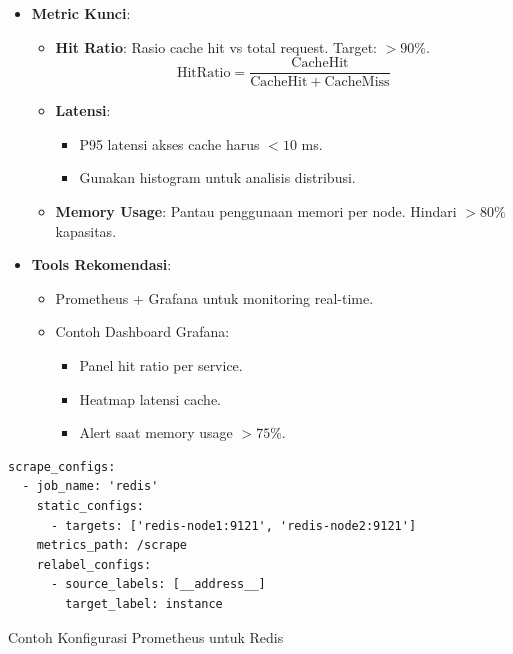 \documentclass[11pt, a4paper]{book}
\begin{document}
	\begin{itemize}
		\item \textbf{Metric Kunci}:  
		\begin{itemize}
			\item \textbf{Hit Ratio}:  
			Rasio cache hit vs total request. Target: $>90\%$.  
			\[
			\mathrm{Hit Ratio} = \frac{\mathrm{Cache Hit}}{\mathrm{Cache Hit} + \mathrm{Cache Miss}}
			\]
			
			\item \textbf{Latensi}:  
			\begin{itemize}
				\item P95 latensi akses cache harus $<10$ ms.  
				\item Gunakan histogram untuk analisis distribusi.  
			\end{itemize}
			
			\item \textbf{Memory Usage}:  
			Pantau penggunaan memori per node. Hindari $>80\%$ kapasitas.  
		\end{itemize}
		
		\item \textbf{Tools Rekomendasi}:  
		\begin{itemize}
			\item Prometheus + Grafana untuk monitoring real-time.  
			\item Contoh Dashboard Grafana:  
			\begin{itemize}
				\item Panel hit ratio per service.  
				\item Heatmap latensi cache.  
				\item Alert saat memory usage $>75\%$.  
			\end{itemize}
		\end{itemize}
	\end{itemize}
	
	\begin{listing}[H]
		\begin{verbatim}
scrape_configs:
  - job_name: 'redis'
    static_configs:
      - targets: ['redis-node1:9121', 'redis-node2:9121']
    metrics_path: /scrape
    relabel_configs:
      - source_labels: [__address__]
        target_label: instance
		\end{verbatim}
		\caption{Contoh Konfigurasi Prometheus untuk Redis}	
	\end{listing}
	
\end{document}
